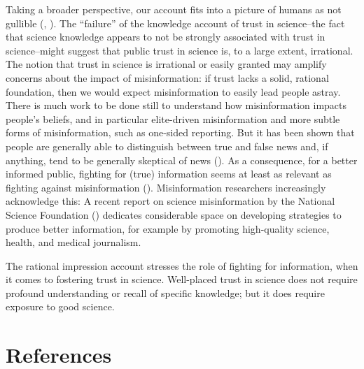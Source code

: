 \documentclass[
  jou,
  floatsintext,
  longtable,
  nolmodern,
  notxfonts,
  notimes,
  colorlinks=true,linkcolor=blue,citecolor=blue,urlcolor=blue]{apa7}
\begin{document}
Taking a broader perspective, our account fits into a picture of humans
as not gullible (, ). The
``failure'' of the knowledge account of trust in science--the fact that
science knowledge appears to not be strongly associated with trust in
science--might suggest that public trust in science is, to a large
extent, irrational. The notion that trust in science is irrational or
easily granted may amplify concerns about the impact of misinformation:
if trust lacks a solid, rational foundation, then we would expect
misinformation to easily lead people astray. There is much work to be
done still to understand how misinformation impacts people's beliefs,
and in particular elite-driven misinformation and more subtle forms of
misinformation, such as one-sided reporting. But it has been shown that
people are generally able to distinguish between true and false news
and, if anything, tend to be generally skeptical of news
().
As a consequence, for a better informed public, fighting for (true)
information seems at least as relevant as fighting against
misinformation (). Misinformation researchers increasingly acknowledge this: A
recent report on science misinformation by the National Science
Foundation
() dedicates considerable space on developing
strategies to produce better information, for example by promoting
high-quality science, health, and medical journalism.

The rational impression account stresses the role of fighting for
information, when it comes to fostering trust in science. Well-placed
trust in science does not require profound understanding or recall of
specific knowledge; but it does require exposure to good science.

\section{References}\label{references}
\end{document}
